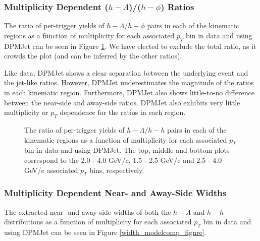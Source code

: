 \subsubsection{Multiplicity Dependent ($h-\Lambda$)/($h-\phi$) Ratios}
\label{lambda_phi_ratio_modelcomp}

The ratio of per-trigger yields of $h-\Lambda$/$h-\phi$ pairs in each of the kinematic regions as a function of multiplicity for each associated $p_{T}$ bin in data and using DPMJet can be seen in Figure \ref{lambda_phi_ratio_modelcomp_figure}. We have elected to exclude the total ratio, as it crowds the plot (and can be inferred by the other ratios). 

Like data, DPMJet shows a clear separation between the underlying event and the jet-like ratios. However, DPMJet underestimates the magnitude of the ratios in each kinematic region. Furthermore, DPMJet also shows little-to-no difference between the near-side and away-side ratios. DPMJet also exhibits very little multiplicity or $p_{T}$ dependence for the ratios in each region.

\begin{figure}[ht]
\centering
\begin{subfigure}{
\texttt{[image: figures/lambda\_phi\_ratio\_plot\_with\_dpmjet.pdf]}}
\end{subfigure}
\begin{subfigure}{
\texttt{[image: figures/lambda\_phi\_ratio\_plot\_lowpt\_with\_dpmjet.pdf]}}
\end{subfigure}
\begin{subfigure}{
\texttt{[image: figures/lambda\_phi\_ratio\_plot\_highpt\_with\_dpmjet.pdf]}}
\end{subfigure}
\caption{The ratio of per-trigger yields of $h-\Lambda$/$h-h$ pairs in each of the kinematic regions as a function of multiplicity for each associated $p_{T}$ bin in data and using DPMJet. The top, middle and bottom plots correspond to the 2.0 - 4.0 GeV/c, 1.5 - 2.5 GeV/c and 2.5 - 4.0 GeV/c associated $p_{T}$ bins, respectively.}
\label{lambda_phi_ratio_modelcomp_figure}
\end{figure}

\subsubsection{Multiplicity Dependent Near- and Away-Side Widths}
\label{width_modelcomp}
The extracted near- and away-side widths of both the $h-\Lambda$ and $h-h$ distributions as a function of multiplicity for each associated $p_{T}$ bin in data and using DPMJet can be seen in Figure \ref{width_modelcomp_figure}. 

